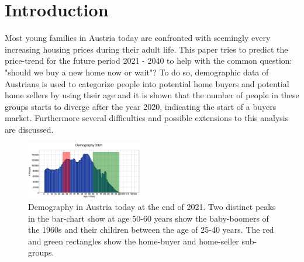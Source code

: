 \documentclass[11pt, a4paper, twocolumn]{article}
\begin{document}

\twocolumn[
  \begin{@twocolumnfalse}
    \maketitle
    \begin{abstract}
      \abstractText
      \newline
      \newline
    \end{abstract}
  \end{@twocolumnfalse}
]


\section{Introduction\label{ch:Introduction}}

Most young families in Austria today are confronted with seemingly every increasing housing prices during their adult life. This paper tries to predict the price-trend for the future period 2021 - 2040 to help with the common question: "should we buy a new home now or wait"? To do so, demographic data of Austrians is used to categorize people into potential home buyers and potential home sellers by using their age and it is shown that the number of people in these groups starts to diverge after the year 2020, indicating the start of a buyers market. Furthermore several difficulties and possible extensions to this analysis are discussed.
\vspace{0.2cm}

\begin{figure}[!ht]
\includegraphics[width=0.45\textwidth]{../Figures/Demog2021.png}
\caption{\small Demography in Austria today at the end of 2021. Two distinct peaks in the bar-chart show at age 50-60 years show the baby-boomers of the 1960s and their children between the age of 25-40 years. The red and green rectangles show the home-buyer and home-seller sub-groups. \label{Demog2021}}
\end{figure}
\end{document}
